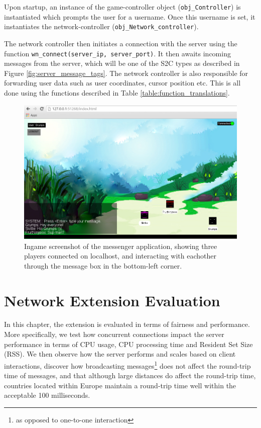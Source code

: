 \documentclass[bsc, 12pt, twoside, singlespacing, parskip, abbrevs, notimes, normalheadings, logo]{styles/infthesis}
\begin{document}
Upon startup, an instance of the game-controller object (\texttt{obj\_Controller}) is instantiated which prompts the user for a username. Once this username is set, it instantiates the network-controller (\texttt{obj\_Network\_controller}).

The network controller then initiates a connection with the server using the function \texttt{wn\_connect(server\_ip, server\_port)}. It then awaits incoming messages from the server, which will be one of the S2C types as described in Figure \ref{fig:server_message_tags}. The network controller is also responsible for forwarding user data such as user coordinates, cursor position etc. This is all done using the functions described in Table \ref{table:function_translations}.

\begin{figure}[H]
\centering
\includegraphics[scale=0.44]{images/messenger.jpg}
\caption{Ingame screenshot of the messenger application, showing three players connected on localhost, and interacting with eachother through the message box in the bottom-left corner.}
\label{fig:messenger}
\end{figure}

\chapter{Network Extension Evaluation}
In this chapter, the extension is evaluated in terms of fairness and performance. More specifically, we test how concurrent connections impact the server performance in terms of CPU usage, CPU processing time and Resident Set Size (RSS). We then observe how the server performs and scales based on client interactions, discover how broadcasting messages\footnote{as opposed to one-to-one interaction} does not affect the round-trip time of messages, and that although large distances do affect the round-trip time, countries located within Europe maintain a round-trip time well within the acceptable 100 milliseconds.
\end{document}
